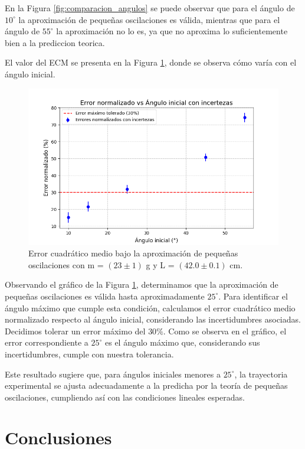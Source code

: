 \documentclass[12pt,a4]{article}
\begin{document}
En la Figura \ref{fig:comparacion_angulos} se puede observar que para el ángulo de $10^\circ$ la aproximación de pequeñas oscilaciones es válida, mientras que para el ángulo de $55^\circ$ la aproximación no lo es, ya que no aproxima lo suficientemente bien a la prediccion teorica.

El valor del ECM se presenta en la Figura \ref{fig:pequeñas_oscilaciones}, donde se observa cómo varía con el ángulo inicial.

\begin{figure}[H]
    \centering
    \includegraphics[width=0.6\linewidth]{errores_normalizados_incertezas.png}
    \caption{Error cuadrático medio bajo la aproximación de pequeñas oscilaciones con m = $(23\pm1)$ g y L = $(42.0\pm0.1)$ cm.}
    \label{fig:pequeñas_oscilaciones}
\end{figure}
Observando el gráfico de la Figura \ref{fig:pequeñas_oscilaciones}, determinamos que la aproximación de pequeñas oscilaciones es válida hasta aproximadamente \(25^\circ\). Para identificar el ángulo máximo que cumple esta condición, calculamos el error cuadrático medio normalizado respecto al ángulo inicial, considerando las incertidumbres asociadas. Decidimos tolerar un error máximo del \(30\%\). Como se observa en el gráfico, el error correspondiente a \(25^\circ\) es el ángulo máximo que, considerando sus incertidumbres, cumple con nuestra tolerancia.

Este resultado sugiere que, para ángulos iniciales menores a \(25^\circ\), la trayectoria experimental se ajusta adecuadamente a la predicha por la teoría de pequeñas oscilaciones, cumpliendo así con las condiciones lineales esperadas.

\section{Conclusiones}
\end{document}

